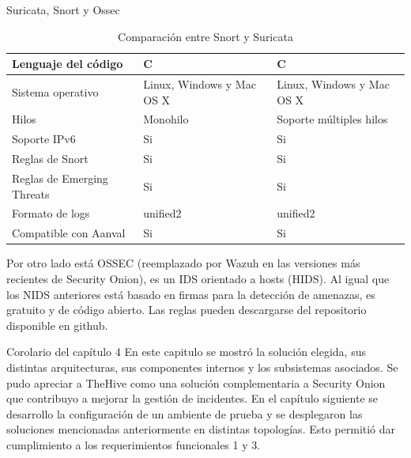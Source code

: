 \begin{subsection}{Suricata, Snort y Ossec}
\begin{table}[H]
\begin{tabular}{|m{10em}|m{11em}|m{11em}|}
                \hline
                    Lenguaje del código & C  & C  \\
                \hline
                    Sistema operativo & Linux, Windows y Mac OS X  & Linux, Windows y Mac OS X  \\
                \hline
                    Hilos & Monohilo  & Soporte múltiples hilos  \\
                \hline
                    Soporte IPv6 & Si  & Si  \\
                \hline
                    Reglas de Snort & Si  & Si \\
                \hline
                    Reglas de Emerging Threats & Si  & Si \\
                \hline
                    Formato de logs & unified2  & unified2   \\
                \hline
                    Compatible con Aanval & Si  & Si   \\
                \hline %
            \end{tabular}
            \caption{Comparación entre Snort y Suricata}
            \label{table:4}
        \end{table}
        \FloatBarrier
        Por otro lado está OSSEC (reemplazado por  Wazuh en las versiones más recientes de Security Onion), es un IDS orientado a hosts (HIDS). Al igual que los NIDS anteriores está basado en firmas para la detección de amenazas, es gratuito y de código abierto. Las reglas pueden descargarse del repositorio disponible en github. \par
   \end{subsection}
   \begin{section}{Corolario del capítulo 4}
        En este capitulo se mostró la solución elegida, sus distintas arquitecturas, sus componentes internos y los subsistemas asociados. Se pudo apreciar a TheHive como una solución complementaria a Security Onion que contribuyo a mejorar la gestión de incidentes.
        En el capítulo siguiente se desarrollo la configuración de un ambiente de prueba y se desplegaron las soluciones mencionadas anteriormente en distintas topologías. Esto permitió dar cumplimiento a los requerimientos funcionales 1 y 3. \par
   \end{section}